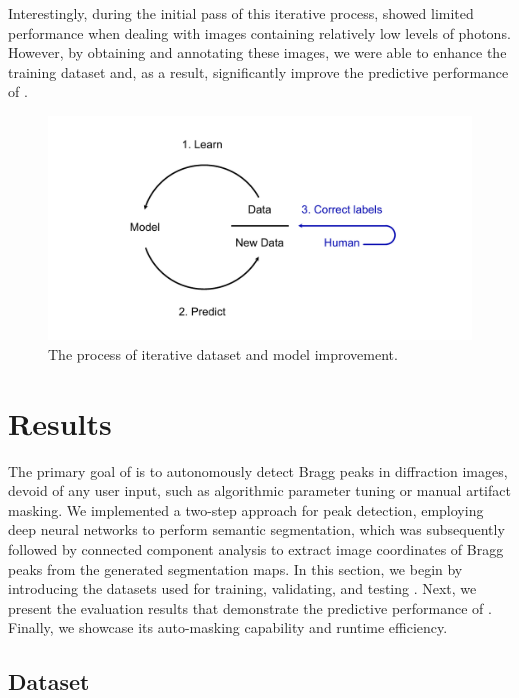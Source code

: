 \documentclass[a4paper]{article}
\begin{document}
Interestingly, during the initial pass of this iterative process, \peaknet{}
showed limited performance when dealing with images containing relatively low
levels of photons.  However, by obtaining and annotating these images, we were
able to enhance the training dataset and, as a result, significantly improve the
predictive performance of \peaknet{}.


\begin{figure}[!ht]
\centering
\includegraphics[width=\columnwidth,keepaspectratio,trim={1in 0in 1in 0in}]
{./figures/data_engine.pdf}
\caption{The process of iterative dataset and model improvement.}
\label{fig : data engine}
\end{figure}


\section{Results}

The primary goal of \peaknet{} is to autonomously detect Bragg peaks in
diffraction images, devoid of any user input, such as algorithmic parameter
tuning or manual artifact masking.  We implemented a two-step approach for peak
detection, employing deep neural networks to perform semantic segmentation,
which was subsequently followed by connected component analysis to extract image
coordinates of Bragg peaks from the generated segmentation maps.  In this
section, we begin by introducing the datasets used for training, validating, and
testing \peaknet{}. Next, we present the evaluation results that demonstrate the
predictive performance of \peaknet{}. Finally, we showcase its auto-masking
capability and runtime efficiency.


\subsection{Dataset}
\end{document}
